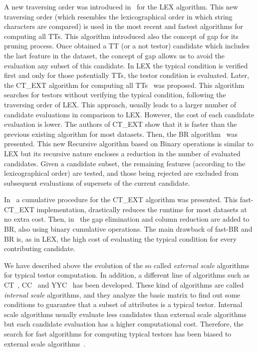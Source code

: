 \documentclass[citenumber]{llncs}
\begin{document}
	A new traversing order was introduced in~\cite{Santiesteban2003} for the LEX algorithm. This new traversing order (which resembles the lexicographical order in which string characters are compared) is used in the most recent and fastest algorithms for computing all TTs. This algorithm introduced also the concept of gap for its pruning process. Once obtained a TT (or a not testor) candidate which includes the last feature in the dataset, the concept of gap allows us to avoid the evaluation any subset of this candidate. In LEX the typical condition is verified first and only for those potentially TTs, the testor condition is evaluated. Later, the CT\_EXT algorithm for computing all TTs~\cite{Sanchez2007} was proposed. This algorithm searches for testors without verifying the typical condition, following the traversing order of LEX. This approach, usually leads to a larger number of candidate evaluations in comparison to LEX. However, the cost of each candidate evaluation is lower. The authors of CT\_EXT show that it is faster than the previous existing algorithm for most datasets. Then, the BR algorithm~\cite{Lias2009} was presented. This new Recursive algorithm based on Binary operations is similar to LEX but its recursive nature encloses a reduction in the number of evaluated candidates. Given a candidate subset, the remaining features (according to the lexicographical order) are tested, and those being rejected are excluded from subsequent evaluations of supersets of the current candidate.
	
	In~\cite{Sanchez2010} a cumulative procedure for the CT\_EXT algorithm was presented. This fast-CT\_EXT implementation, drastically reduces the runtime for most datasets at no extra cost. Then, in~\cite{Lias2013} the gap elimination and column reduction are added to BR, also using binary cumulative operations. The main drawback of fast-BR and BR is, as in LEX, the high cost of evaluating the typical condition for every contributing candidate. 
	
	We have described above the evolution of the so called \emph{external scale} algorithms for typical testor computation. In addition, a different line of algorithms such as CT~\cite{Bravo83}, CC~\cite{Aguila84} and YYC~\cite{Alba14} has been developed. These kind of algorithms are called \emph{internal scale} algorithms, and they analyze the basic matrix to find out some conditions to guarantee that a subset of attributes is a typical testor. Internal scale algorithms usually evaluate less candidates than external scale algorithms but each candidate evaluation has a higher computational cost. Therefore, the search for fast algorithms for computing typical testors has been biased to external scale algorithms~\cite{Alba14}.
	
\end{document}
